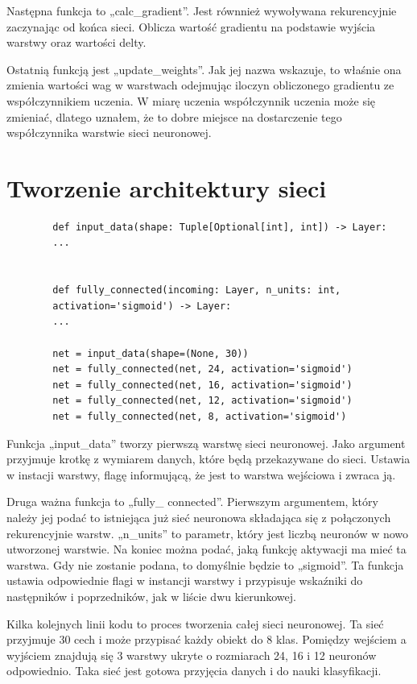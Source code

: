 \documentclass{report}
\begin{document}
    Następna funkcja to „calc\_gradient”.
    Jest równnież wywoływana rekurencyjnie zaczynając od końca sieci.
    Oblicza wartość gradientu na podstawie wyjścia warstwy oraz wartości delty.

    Ostatnią funkcją jest „update\_weights”.
    Jak jej nazwa wskazuje, to właśnie ona zmienia wartości wag w warstwach odejmując iloczyn obliczonego gradientu ze współczynnikiem uczenia.
    W miarę uczenia współczynnik uczenia może się zmieniać, dlatego uznałem, że to dobre miejsce na dostarczenie tego współczynnika warstwie sieci neuronowej.

    \section{Tworzenie architektury sieci}\label{sec:tworzenieArchitekturySieci}

    \begin{lstlisting}
        def input_data(shape: Tuple[Optional[int], int]) -> Layer:
        ...


        def fully_connected(incoming: Layer, n_units: int,
        activation='sigmoid') -> Layer:
        ...

        net = input_data(shape=(None, 30))
        net = fully_connected(net, 24, activation='sigmoid')
        net = fully_connected(net, 16, activation='sigmoid')
        net = fully_connected(net, 12, activation='sigmoid')
        net = fully_connected(net, 8, activation='sigmoid')
    \end{lstlisting}
    \label{Tworzenie architektury sieci}

    Funkcja „input\_data” tworzy pierwszą warstwę sieci neuronowej.
    Jako argument przyjmuje krotkę z wymiarem danych, które będą przekazywane do sieci.
    Ustawia w instacji warstwy, flagę informującą, że jest to warstwa wejściowa i zwraca ją.

    Druga ważna funkcja to „fully\_ connected”.
    Pierwszym argumentem, który należy jej podać to istniejąca już sieć neuronowa składająca się z połączonych rekurencyjnie warstw.
    „n\_units” to parametr, który jest liczbą neuronów w nowo utworzonej warstwie.
    Na koniec można podać, jaką funkcję aktywacji ma mieć ta warstwa.
    Gdy nie zostanie podana, to domyślnie będzie to „sigmoid”.
    Ta funkcja ustawia odpowiednie flagi w instancji warstwy i przypisuje wskaźniki do następników i poprzedników, jak w liście dwu kierunkowej.

    Kilka kolejnych linii kodu to proces tworzenia całej sieci neuronowej.
    Ta sieć przyjmuje 30 cech i może przypisać każdy obiekt do 8 klas.
    Pomiędzy wejściem a wyjściem znajdują się 3 warstwy ukryte o rozmiarach 24, 16 i 12 neuronów odpowiednio.
    Taka sieć jest gotowa przyjęcia danych i do nauki klasyfikacji.
\end{document}
